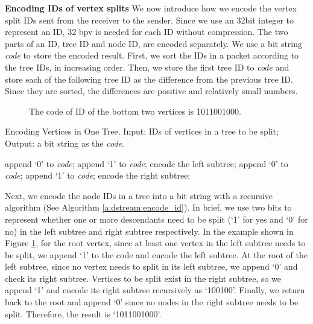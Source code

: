     \textbf{Encoding IDs of vertex splits}
    We now introduce how we encode the vertex split IDs sent from the receiver to the
    sender. Since we use an 32bit integer to represent an ID,  32 bpv is needed for each ID
    without compression.  
    The two parts of an ID, tree ID and node ID, are encoded separately.  
    We use a bit string \textit{code} to store the encoded result.
    First, we sort the IDs in a packet according to the tree IDs, in increasing order. 
    Then, we store the first tree ID to \textit{code} and 
    store each of the following tree ID as the difference from the previous tree ID.
    Since they are sorted, the differences are positive and relatively small numbers.

    \begin{figure}
    \centering
    \caption{The code of ID of the bottom two
    vertices is 1011001000. 
    \label{f:dstream:encode_id}}
    \end{figure}
    \begin{algorithm}
    \caption{Encoding Vertices in One Tree.
    Input: IDs of vertices in a tree to be split;
    Output: a bit string as the \emph{code}.\label{a:dstream:encode_id}}
    \begin{algorithmic}
        \STATE append `0' to \emph{code};
    \ELSE
        \STATE append `1' to \emph{code};
        \STATE encode the left subtree;
    \ENDIF
        \STATE append `0' to \emph{code};
    \ELSE
        \STATE append `1' to \emph{code};
        \STATE encode the right subtree;
    \ENDIF
    \end{algorithmic}
    \end{algorithm}
    Next, we encode the node IDs in a tree into a bit string with 
    a recursive algorithm (See Algorithm \ref{a:dstream:encode_id}).
    In brief, we use two bits to represent whether one or more descendants need
    to be split (`1' for yes and `0' for no)
    in the left subtree and right subtree respectively. 
    In the example shown in Figure \ref{f:dstream:encode_id}, for the root vertex, since at least one vertex
    in the left subtree needs to be split, we append `1' to the code and encode the
    left subtree. At the root of the left subtree, since no vertex needs to split in its left
    subtree, we append `0' and check its right subtree. Vertices to be split exist in the right
    subtree, so we append `1' and encode its right subtree recursively as `100100'. 
    Finally, we return back to the root and append `0' since 
    no nodes in the right subtree needs to be split. 
    Therefore, the result is `1011001000'.
        
